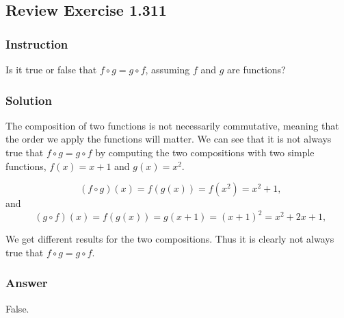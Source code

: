 \subsection*{Review Exercise 1.311}

\subsubsection*{Instruction}

Is it true or false that $ f \circ g = g \circ f $, assuming  $ f $ and $ g $ are functions?

\subsubsection*{Solution}

The composition of two functions is not necessarily commutative, meaning that the order we apply the functions will matter. We can see that it is not always true that $ f \circ g = g \circ f $ by computing the two compositions with two simple functions, $ f(x) = x + 1 $ and $ g(x) = x^2$.

\[ \phantom{,} (f \circ g)(x) = f(g(x)) = f(x^2) = x^2 + 1 \text{,}\]
and
\[ \phantom{,} (g \circ f)(x) = f(g(x)) = g(x + 1) = (x + 1)^2 = x^2 + 2x + 1 \text{,}\]

We get different results for the two compositions. Thus it is clearly not always true that $ f \circ g = g \circ f $.

\subsubsection*{Answer}

False.
